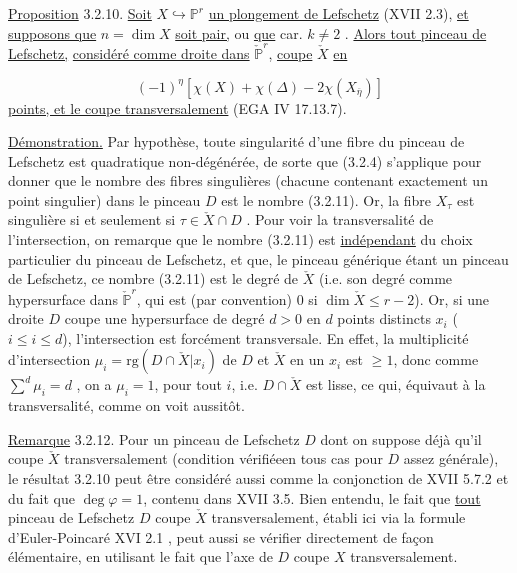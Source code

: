 \underline{Proposition} 3.2.10. \underline{Soit} $X \hookrightarrow \mathbb{P}^{r}$ \underline{un plongement de Lefschetz} (XVII 2.3), \underline{et supposons que} $n = \dim X$ \underline{soit pair,} ou \underline{que} car. $k \neq 2$ . \underline{Alors tout pinceau de Lefschetz,} \underline{considéré comme droite dans} $\check{\mathbb{P}}^{r}$, \underline{coupe} $\check{X}$ \underline{en}

\begin{equation}\tag{3.2.11}
(-1)^{\eta} [ \chi(X) + \chi(\Delta) - 2 \chi (X_{\overline{\eta}})]
\end{equation}
\underline{points, et le coupe transversalement} (EGA IV 17.13.7).

\underline{Démonstration.} Par hypothèse, toute singularité d'une fibre du pinceau de Lefschetz est quadratique non-dégénérée, de sorte que (3.2.4) s'applique pour donner que le nombre des fibres singulières (chacune contenant exactement un point singulier) dans le pinceau $D$ est le nombre (3.2.11). Or, la fibre $X_{\tau}$ est singulière si et seulement si $\tau \in \check{X} \cap D$ . Pour voir la transversalité de l'intersection, on remarque que le nombre (3.2.11) est \underline{indépendant} du choix particulier du pinceau de Lefschetz, et que, le pinceau générique étant un pinceau de Lefschetz, ce nombre (3.2.11) est le degré de $\check{X}$ (i.e. son degré comme hypersurface dans $\check{\mathbb{P}}^{r}$, qui est (par convention) $0$ si $\dim \check{X} \leq r-2$). Or, si une droite $D$ coupe une hypersurface de degré $d > 0$ en $d$ points distincts $x_{i}$ ($i \leq i \leq d$), l'intersection est forcément transversale. En effet, la multiplicité d'intersection $\mu_{i} = \mathrm{rg}(D \cap \check{X}|x_{i})$ de $D$ et $\check{X}$ en un $x_{i}$ est $\geq 1$, donc comme $\sum\limits^{d} \mu_{i} = d$ , on a $\mu_{i} = 1$, pour tout $i$, i.e. $D \cap \check{X}$ est lisse, ce qui, équivaut à la transversalité, comme on voit aussitôt.



\underline{Remarque} 3.2.12. Pour un pinceau de Lefschetz $D$ dont on suppose déjà qu'il coupe $\check{X}$ transversalement (condition vérifiéeen tous cas pour $D$ assez générale), le résultat 3.2.10 peut être considéré aussi comme la conjonction de XVII 5.7.2 et du fait que $\deg \varphi = 1$, contenu dans XVII 3.5. Bien entendu, le fait que \underline{tout} pinceau de Lefschetz $D$ coupe $\check{X}$ transversalement, établi ici via la formule d'Euler-Poincaré XVI 2.1 , peut aussi se vérifier directement de façon élémentaire, en utilisant le fait que l'axe de $D$ coupe $X$ transversalement.


